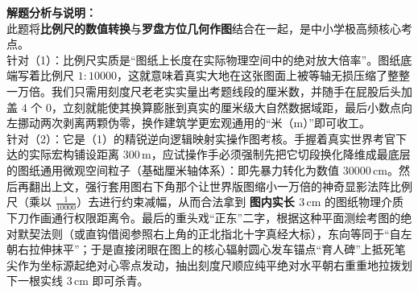 {\small\color{gray}
\textbf{解题分析与说明：}\\
此题将\textbf{比例尺的数值转换}与\textbf{罗盘方位几何作图}结合在一起，是中小学极高频核心考点。\\
针对（1）：比例尺实质是“图纸上长度在实际物理空间中的绝对放大倍率”。图纸底端写着比例尺 $1:10000$，这就意味着真实大地在这张图面上被等轴无损压缩了整整一万倍。我们只需用刻度尺老老实实量出考题线段的厘米数，并随手在屁股后头加盖 $4$ 个 $0$，立刻就能使其换算膨胀到真实的厘米级大自然数据域距，最后小数点向左挪动两次剥离两颗伪零，换作建筑学更宏观通用的“米（$\text{m}$）”即可收工。\\
针对（2）：它是（1）的精锐逆向逻辑映射实操作图考核。手握着真实世界考官下达的实际宏构铺设距离 $300\,\text{m}$，应试操作手必须强制先把它切段换化降维成最底层的图纸通用微观空间粒子（基础厘米轴体系）：即先暴力转化为数值 $30000\,\text{cm}$。然后再翻出上文，强行套用图右下角那个让世界版图缩小一万倍的神奇显影法阵比例尺（乘以 $\frac{1}{10000}$）去进行约束减幅，从而合法拿到 \textbf{图内实长 $3\,\text{cm}$} 的图纸物理介质下刀作画通行权限距离令。最后的重头戏“正东”二字，根据这种平面测绘考图的绝对默契法则（或直钩借阅参照右上角的正北指北十字真经大标），东向等同于“自左朝右拉伸抹平”；于是直接闭眼在图上的核心辐射圆心发车锚点“育人碑”上抵死笔尖作为坐标源起绝对心零点发动，抽出刻度尺顺应纯平绝对水平朝右重重地拉拨划下一根实线 $3\,\text{cm}$ 即可杀青。
}

\vspace{0.6cm}

